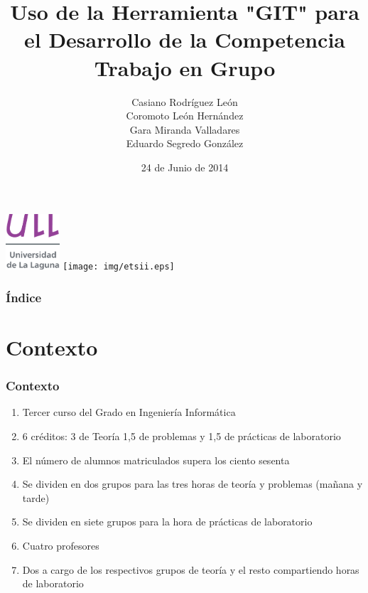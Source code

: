 \documentclass{beamer}
\title[Lenguajes y Paradigmas de Programación]{Uso de la Herramienta "GIT" para el Desarrollo de la Competencia Trabajo en Grupo}
\author[C. Rguez et. al.]{
Casiano Rodríguez León\\
Coromoto León Hernández\\
Gara Miranda Valladares\\
Eduardo Segredo González
}
\institute[ULL]{Escuela Tecnica Superior de Ingeniería Informática\\
                Universidad de La Laguna}
\date[24-06-2014]{24 de Junio de 2014}
\begin{document}
  
\begin{frame}

  \includegraphics[width=0.15\textwidth]{img/ullesc.eps}
  \hspace*{7.5cm}
  \texttt{[image: img/etsii.eps]}
  \titlepage


\end{frame}

\begin{frame}
  \frametitle{Índice}  
  \tableofcontents[pausesections]
\end{frame}


\section{Contexto}


\begin{frame}

\frametitle{Contexto}
%

\begin{enumerate}[<+->]
\item 
Tercer curso del Grado en Ingeniería Informática
\item 6 créditos: 3 de Teoría 1,5 de problemas y 1,5 de prácticas de laboratorio
\item 
El número de alumnos matriculados supera los ciento sesenta
\item 
Se dividen en dos grupos para las tres horas de teoría y problemas (mañana y tarde)
\item 
Se dividen en siete grupos para la hora de prácticas de laboratorio
\item 
Cuatro profesores
\item Dos a cargo de los
respectivos grupos de teoría y el resto compartiendo horas de laboratorio
\end{enumerate}

\end{frame}
\end{document}
